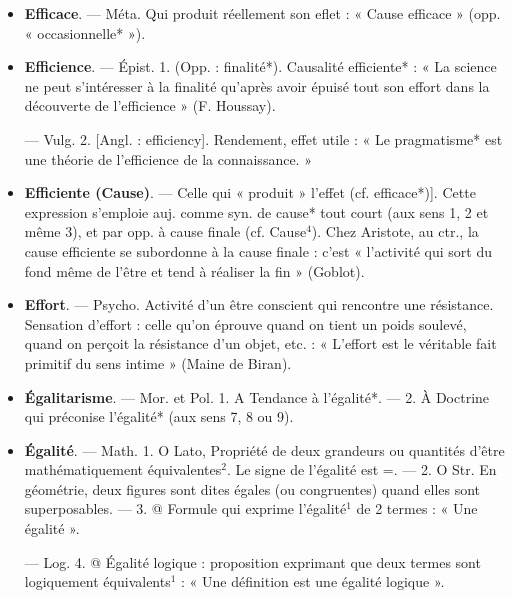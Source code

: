 \begin{itemize}[leftmargin=1cm, label=, itemsep=1pt]
\item {\bf Efficace}. — Méta. Qui produit réellement son eflet : « Cause efficace »
(opp. « occasionnelle* »).

\item {\bf Efficience}. — Épist. 1. (Opp. : finalité*). Causalité efficiente* : « La
science ne peut s'intéresser à la finalité qu'après avoir épuisé tout son
effort dans la découverte de l’efficience » (F. Houssay).

— Vulg. 2. [Angl. : efficiency].
Rendement, effet utile : « Le pragmatisme* est une théorie de l’efficience de la connaissance. »

\item {\bf Efficiente (Cause)}. — Celle qui « produit » l'effet (cf. efficace*)]. Cette
expression s'emploie auj. comme
syn. de cause* tout court (aux
sens 1, 2 et même 3), et par opp.
à cause finale (cf. Cause$^4$). Chez
Aristote, au ctr., la cause efficiente
se subordonne à la cause finale :
c’est « l’activité qui sort du fond
même de l’être et tend à réaliser la
fin » (Goblot).

\item {\bf Effort}. — Psycho. Activité d’un être
conscient qui rencontre une résistance. Sensation d’effort : celle qu’on
éprouve quand on tient un poids
soulevé, quand on perçoit la résistance d’un objet, etc. : « L’effort
est le véritable fait primitif du sens
intime » (Maine de Biran).

\item {\bf Égalitarisme}. — Mor. et Pol. 1. A
Tendance à l’égalité*. — 2. À Doctrine qui préconise l’égalité* (aux
sens 7, 8 ou 9).

\item {\bf Égalité}. — Math. 1. O Lato, Propriété
de deux grandeurs ou quantités
d’être mathématiquement équivalentes$^2$. Le signe de l'égalité est =.
— 2. O Str. En géométrie, deux
figures sont dites égales (ou congruentes) quand elles sont superposables. — 3. @ Formule qui exprime
l'égalité$^1$ de 2 termes : « Une égalité ».

— Log. 4. @ Égalité logique : proposition exprimant que deux termes
sont logiquement équivalents$^1$ :
« Une définition est une égalité logique ».


\end{itemize}
